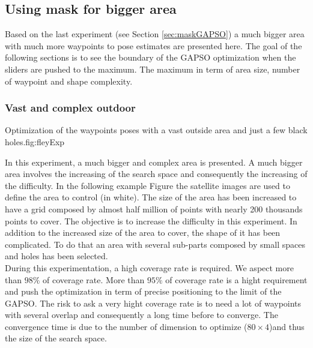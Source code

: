 	\subsection{Using mask for bigger area}
	Based on the last experiment (see Section \ref{sec:maskGAPSO}) a much bigger area with much more waypoints to pose estimates are presented here. The goal of the following sections is to see the boundary of the  GAPSO optimization when the sliders are pushed to the maximum. The maximum in term of area size, number of waypoint and shape complexity.
	
		\subsubsection{Vast and complex outdoor}\label{sec:fey_map}

\begin{mfigures}[!]{Optimization of the waypoints poses with a vast outside area and just a few  black holes.}{fig:fleyExp} \centering
{}
\hspace{1cm}
\hspace{1cm}
\tabsimuposeFley
\end{mfigures}


In this experiment, a much bigger and complex area is presented.
	A much bigger area involves the increasing of the search space and consequently the increasing of the difficulty. 
In the following example Figure  the satellite images are used to define the area to control (in white). The size of the area has been increased to have a grid composed by almost half million of points with nearly 200 thousands points to cover. 
The objective is to increase the difficulty in this experiment. In addition to the increased size of the area to cover, the shape of it has been complicated. To do that an area with several sub-parts composed by small spaces and holes has been selected.\\
During this experimentation, a high coverage rate is required. We aspect more than $98\%$ of coverage rate. More than $95\%$ of coverage rate is a hight requirement and push the optimization in term of precise positioning to the limit of the GAPSO. The risk to ask a very hight coverage rate is to need a lot of waypoints with several overlap and consequently a long time before to converge.  The convergence time is due to the number of dimension to optimize  ($80\times 4 $)and  thus the size of the search space.

